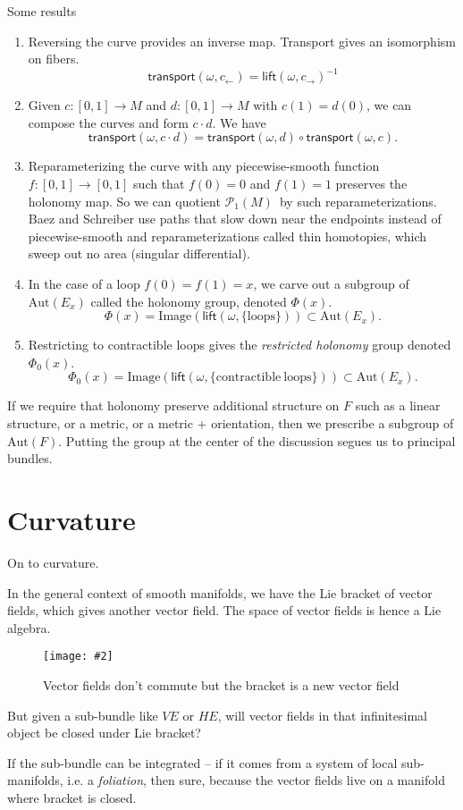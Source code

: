 \documentclass[12pt]{article}
\newcommand{\lift}{\ensuremath{\textsf{lift}}}
\newcommand{\transport}{\ensuremath{\textsf{transport}}}
\newcommand{\pathm}{\ensuremath{\mathcal{P}_1 (M)}}
\newcommand{\Aut}{\mathrm{Aut}}
\newcommand{\image}{\mathrm{Image}}
\newcommand{\myfig}[2]{\begin{figure}[h]\caption{#1}\centering\texttt{[image: \#2]}\end{figure}}
\begin{document}
Some results
\begin{enumerate}
    \item Reversing the curve provides an inverse map. Transport gives an isomorphism on fibers. $$\transport (\omega, c_{\leftarrow}) = \lift (\omega, c_{\rightarrow})^{-1}$$
	\item Given $c:[0,1]\to M$ and $d:[0,1]\to M$ with $c(1) = d(0)$, we can compose the curves and form $c\cdot d$. We have $$\transport (\omega, c\cdot d) = \transport (\omega, d)\circ\transport (\omega, c).$$
    \item Reparameterizing the curve with any piecewise-smooth function $f:[0, 1]\to [0, 1]$ such that $f(0)=0$ and $f(1)=1$ preserves the holonomy map. So we can quotient \pathm\ by such reparameterizations. Baez and Schreiber use paths that slow down near the endpoints instead of piecewise-smooth and reparameterizations called thin homotopies, which sweep out no area (singular differential).
    \item In the case of a loop $f(0)=f(1)=x$, we carve out a subgroup of $\Aut(E_x)$ called the holonomy group, denoted $\Phi(x)$. $$\Phi(x)=\image(\lift(\omega, \{\mathrm{loops}\}) )\subset \Aut(E_x).$$
    \item Restricting to contractible loops gives the \emph{restricted holonomy} group denoted $\Phi_0(x)$. $$\Phi_0(x)=\image(\lift(\omega, \{\mathrm{contractible\ loops}\}) )\subset \Aut(E_x).$$
\end{enumerate}

If we require that holonomy preserve additional structure on $F$ such as a linear structure, or a metric, or a metric + orientation, then we prescribe a subgroup of $\Aut(F)$. Putting the group at the center of the discussion segues us to principal bundles.

\section{Curvature}
On to curvature.

In the general context of smooth manifolds, we have the Lie bracket of vector fields, which gives another vector field. The space of vector fields is hence a Lie algebra.

\myfig{Vector fields don't commute but the bracket is a new vector field}{lie_bracket_nonzero}

But given a sub-bundle like $VE$ or $HE$, will vector fields in that infinitesimal object be closed under Lie bracket?

If the sub-bundle can be integrated -- if it comes from a system of local sub-manifolds, i.e. a \emph{foliation}, then sure, because the vector fields live on a manifold where bracket is closed.
\end{document}
